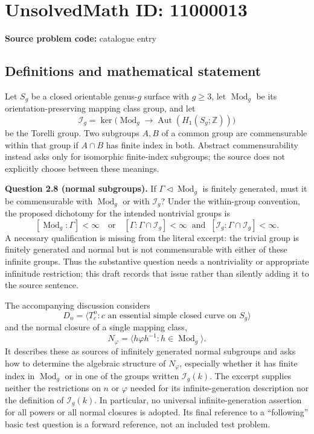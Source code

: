\documentclass[11pt]{article}
\newcommand{\Z}{\mathbb{Z}}
\begin{document}
\section*{UnsolvedMath ID: 11000013}
\textbf{Source problem code:} catalogue entry
\subsection{Definitions and mathematical statement}
Let $S_g$ be a closed orientable genus-$g$ surface with $g\ge3$, let $\operatorname{Mod}_g$ be its orientation-preserving mapping class group, and let
\[
 \mathcal I_g=\ker\bigl(\operatorname{Mod}_g\longrightarrow
 \operatorname{Aut}(H_1(S_g;\Z))\bigr)
\]
be the Torelli group. Two subgroups $A,B$ of a common group are commensurable within that group if $A\cap B$ has finite index in both. Abstract commensurability instead asks only for isomorphic finite-index subgroups; the source does not explicitly choose between these meanings.

\textbf{Question 2.8 (normal subgroups).} If $\Gamma\triangleleft\operatorname{Mod}_g$ is finitely generated, must it be commensurable with $\operatorname{Mod}_g$ or with $\mathcal I_g$? Under the within-group convention, the proposed dichotomy for the intended nontrivial groups is
\[
 [\operatorname{Mod}_g:\Gamma]<\infty
 \quad\text{or}\quad
 [\Gamma:\Gamma\cap\mathcal I_g]<\infty\ \text{ and }\
 [\mathcal I_g:\Gamma\cap\mathcal I_g]<\infty.
\]
A necessary qualification is missing from the literal excerpt: the trivial group is finitely generated and normal but is not commensurable with either of these infinite groups. Thus the substantive question needs a nontriviality or appropriate infinitude restriction; this draft records that issue rather than silently adding it to the source sentence.

The accompanying discussion considers
\[
 D_n=\langle T_c^n:c\text{ an essential simple closed curve on }S_g\rangle
\]
and the normal closure of a single mapping class,
\[
 N_\varphi=\langle h\varphi h^{-1}:h\in\operatorname{Mod}_g\rangle.
\]
It describes these as sources of infinitely generated normal subgroups and asks how to determine the algebraic structure of $N_\varphi$, especially whether it has finite index in $\operatorname{Mod}_g$ or in one of the groups written $\mathcal I_g(k)$. The excerpt supplies neither the restrictions on $n$ or $\varphi$ needed for its infinite-generation description nor the definition of $\mathcal I_g(k)$. In particular, no universal infinite-generation assertion for all powers or all normal closures is adopted. Its final reference to a ``following'' basic test question is a forward reference, not an included test problem.
\end{document}
